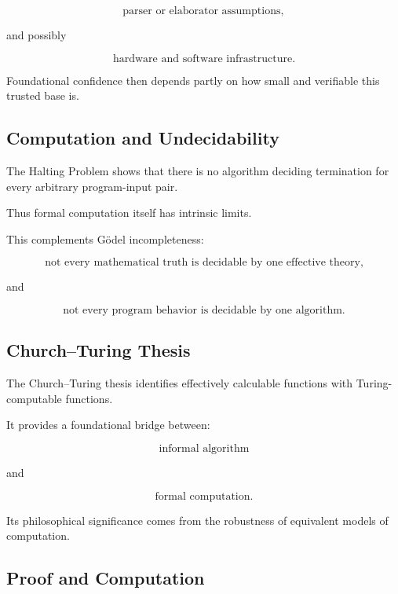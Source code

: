 \[
\boxed{
\text{parser or elaborator assumptions},
}
\]

and possibly

\[
\boxed{
\text{hardware and software infrastructure}.
}
\]

Foundational confidence then depends partly on how small and verifiable this
trusted base is.

\subsection{Computation and Undecidability}
\label{subsec:computation-undecidability-foundations}

The Halting Problem shows that there is no algorithm deciding termination
for every arbitrary program-input pair.

Thus formal computation itself has intrinsic limits.

This complements Gödel incompleteness:

\[
\boxed{
\text{not every mathematical truth is decidable by one effective theory,}
}
\]

and

\[
\boxed{
\text{not every program behavior is decidable by one algorithm.}
}
\]

\subsection{Church--Turing Thesis}
\label{subsec:church-turing-foundations}

The Church--Turing thesis identifies effectively calculable functions with
Turing-computable functions.

It provides a foundational bridge between:

\[
\boxed{
\text{informal algorithm}
}
\]

and

\[
\boxed{
\text{formal computation}.
}
\]

Its philosophical significance comes from the robustness of equivalent
models of computation.

\subsection{Proof and Computation}
\label{subsec:proof-and-computation}

